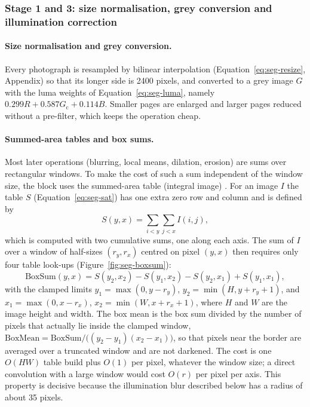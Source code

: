 \subsubsection{Stage 1 and 3: size normalisation, grey conversion and illumination correction}

\paragraph{Size normalisation and grey conversion.}
Every photograph is resampled by bilinear interpolation (Equation~\ref{eq:seg-resize}, Appendix) so that its longer side is 2400 pixels, and converted to a grey image $G$ with the luma weights of Equation~\ref{eq:seg-luma}, namely $0.299R+0.587G_{\mathrm c}+0.114B$.
Smaller pages are enlarged and larger pages reduced without a pre-filter, which keeps the operation cheap.

\paragraph{Summed-area tables and box sums.}
Most later operations (blurring, local means, dilation, erosion) are sums over rectangular windows.
To make the cost of such a sum independent of the window size, the block uses the summed-area table (integral image) \cite{crow1984}.
For an image $I$ the table $S$ (Equation~\ref{eq:seg-sat}) has one extra zero row and column and is defined by
\begin{equation}
S(y,x)=\sum_{i<y}\sum_{j<x} I(i,j),
\label{eq:seg-sat}
\end{equation}
which is computed with two cumulative sums, one along each axis.
The sum of $I$ over a window of half-sizes $(r_y,r_x)$ centred on pixel $(y,x)$ then requires only four table look-ups (Figure~\ref{fig:seg-boxsum}):
\begin{equation}
\mathrm{BoxSum}(y,x)=S(y_2,x_2)-S(y_1,x_2)-S(y_2,x_1)+S(y_1,x_1),
\label{eq:seg-boxsum}
\end{equation}
with the clamped limits $y_1=\max(0,y-r_y)$, $y_2=\min(H,y+r_y+1)$, and $x_1=\max(0,x-r_x)$, $x_2=\min(W,x+r_x+1)$, where $H$ and $W$ are the image height and width.
The box mean is the box sum divided by the number of pixels that actually lie inside the clamped window, $\mathrm{BoxMean}=\mathrm{BoxSum}/\bigl((y_2-y_1)(x_2-x_1)\bigr)$, so that pixels near the border are averaged over a truncated window and are not darkened.
The cost is one $O(HW)$ table build plus $O(1)$ per pixel, whatever the window size; a direct convolution with a large window would cost $O(r)$ per pixel per axis.
This property is decisive because the illumination blur described below has a radius of about 35 pixels.


